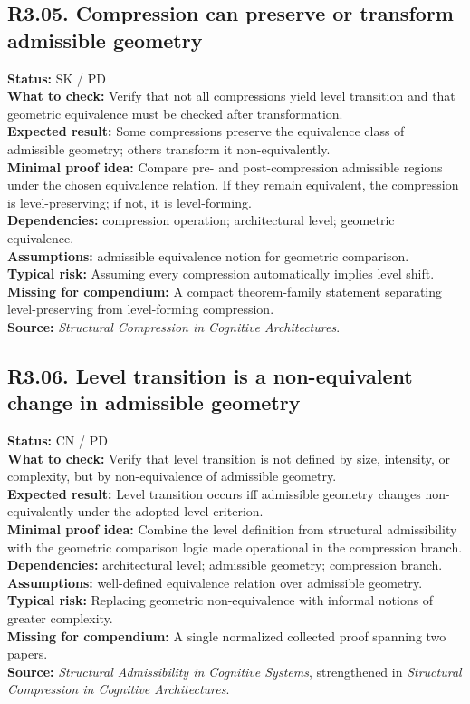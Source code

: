 \documentclass[12pt]{article}
\begin{document}
	\subsection*{R3.05. Compression can preserve or transform admissible geometry}
	\textbf{Status:} SK / PD \\
	\textbf{What to check:} Verify that not all compressions yield level transition and that geometric equivalence must be checked after transformation. \\
	\textbf{Expected result:} Some compressions preserve the equivalence class of admissible geometry; others transform it non-equivalently. \\
	\textbf{Minimal proof idea:} Compare pre- and post-compression admissible regions under the chosen equivalence relation. If they remain equivalent, the compression is level-preserving; if not, it is level-forming. \\
	\textbf{Dependencies:} compression operation; architectural level; geometric equivalence. \\
	\textbf{Assumptions:} admissible equivalence notion for geometric comparison. \\
	\textbf{Typical risk:} Assuming every compression automatically implies level shift. \\
	\textbf{Missing for compendium:} A compact theorem-family statement separating level-preserving from level-forming compression. \\
	\textbf{Source:} \emph{Structural Compression in Cognitive Architectures}.
	
	\subsection*{R3.06. Level transition is a non-equivalent change in admissible geometry}
	\textbf{Status:} CN / PD \\
	\textbf{What to check:} Verify that level transition is not defined by size, intensity, or complexity, but by non-equivalence of admissible geometry. \\
	\textbf{Expected result:} Level transition occurs iff admissible geometry changes non-equivalently under the adopted level criterion. \\
	\textbf{Minimal proof idea:} Combine the level definition from structural admissibility with the geometric comparison logic made operational in the compression branch. \\
	\textbf{Dependencies:} architectural level; admissible geometry; compression branch. \\
	\textbf{Assumptions:} well-defined equivalence relation over admissible geometry. \\
	\textbf{Typical risk:} Replacing geometric non-equivalence with informal notions of greater complexity. \\
	\textbf{Missing for compendium:} A single normalized collected proof spanning two papers. \\
	\textbf{Source:} \emph{Structural Admissibility in Cognitive Systems}, strengthened in \emph{Structural Compression in Cognitive Architectures}.
	
\end{document}
